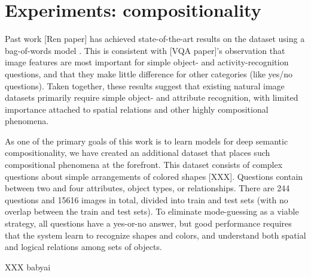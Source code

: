 \documentclass[10pt,twocolumn,letterpaper]{article}
\begin{document}
\section{Experiments: compositionality}

Past work [Ren paper] has achieved state-of-the-art results on the \cocoqa
dataset using a bag-of-words model . This is consistent with [VQA paper]'s
observation that image features are most important for simple object- and
activity-recognition questions, and that they make little difference for other
categories (like yes/no questions). Taken together, these results suggest that
existing natural image datasets primarily require simple object- and attribute
recognition, with limited importance attached to spatial relations and other
highly compositional phenomena.

As one of the primary goals of this work is to learn models for deep semantic
compositionality, we have created an additional dataset that places such
compositional phenomena at the forefront. This dataset consists of complex
questions about simple arrangements of colored shapes [XXX].  Questions contain
between two and four attributes, object types, or relationships.  There are 244
questions and 15616 images in total, divided into train and test sets (with no
overlap between the train and test sets).  To eliminate mode-guessing as a
viable strategy, all questions have a yes-or-no answer, but good performance
requires that the system learn to recognize shapes and colors, and understand
both spatial and logical relations among sets of objects.

XXX babyai
\end{document}
